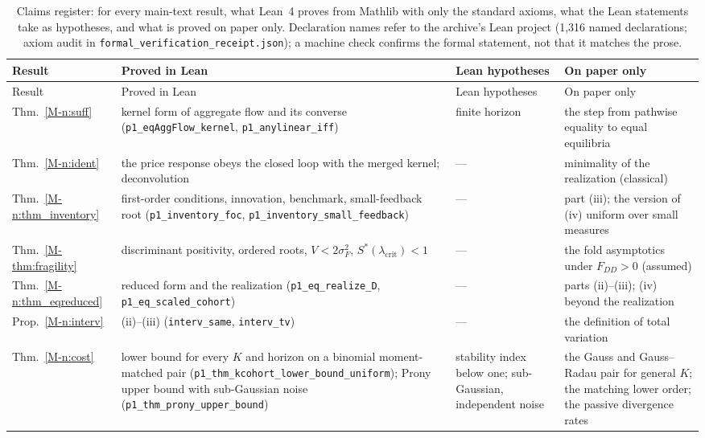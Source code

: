 \documentclass[12pt]{article}
\theoremstyle{definition}
\theoremstyle{remark}
\begin{document}
{\footnotesize
\begin{longtable}{>{\raggedright\arraybackslash}p{}>{\raggedright\arraybackslash}p{}>{\raggedright\arraybackslash}p{}>{\raggedright\arraybackslash}p{}}
\caption{Claims register: for every main-text result, what Lean~4 proves from Mathlib with only the standard axioms, what the Lean statements take as hypotheses, and what is proved on paper only. Declaration names refer to the archive's Lean project (1,316 named declarations; axiom audit in \nolinkurl{formal_verification_receipt.json}); a machine check confirms the formal statement, not that it matches the prose.}\label{tab:claims}\\
\toprule
Result & Proved in Lean & Lean hypotheses & On paper only\\
\midrule
\endfirsthead
\toprule
Result & Proved in Lean & Lean hypotheses & On paper only\\
\midrule
\endhead
Thm.~\ref{M-n:suff} & kernel form of aggregate flow and its converse (\texttt{p1\_\allowbreak{}eqAggFlow\_\allowbreak{}kernel}, \texttt{p1\_\allowbreak{}anylinear\_\allowbreak{}iff}) & finite horizon & the step from pathwise equality to equal equilibria\\
Thm.~\ref{M-n:ident} & the price response obeys the closed loop with the merged kernel; deconvolution & --- & minimality of the realization (classical)\\
Thm.~\ref{M-n:thm_inventory} & first-order conditions, innovation, benchmark, small-feedback root (\texttt{p1\_\allowbreak{}inventory\_\allowbreak{}foc}, \texttt{p1\_\allowbreak{}inventory\_\allowbreak{}small\_\allowbreak{}feedback}) & --- & part (iii); the version of (iv) uniform over small measures\\
Thm.~\ref{M-thm:fragility} & discriminant positivity, ordered roots, $V < 2\sigma_F^2$, $S^*(\lambda_{\mathrm{crit}}) < 1$ & --- & the fold asymptotics under $F_{DD} > 0$ (assumed)\\
Thm.~\ref{M-n:thm_eqreduced} & reduced form and the realization (\texttt{p1\_\allowbreak{}eq\_\allowbreak{}realize\_\allowbreak{}D}, \texttt{p1\_\allowbreak{}eq\_\allowbreak{}scaled\_\allowbreak{}cohort}) & --- & parts (ii)--(iii); (iv) beyond the realization\\
Prop.~\ref{M-n:interv} & (ii)--(iii) (\texttt{interv\_\allowbreak{}same}, \texttt{interv\_\allowbreak{}tv}) & --- & the definition of total variation\\
Thm.~\ref{M-n:cost} & lower bound for every $K$ and horizon on a binomial moment-matched pair (\texttt{p1\_\allowbreak{}thm\_\allowbreak{}kcohort\_\allowbreak{}lower\_\allowbreak{}bound\_\allowbreak{}uniform}); Prony upper bound with sub-Gaussian noise (\texttt{p1\_\allowbreak{}thm\_\allowbreak{}prony\_\allowbreak{}upper\_\allowbreak{}bound}) & stability index below one; sub-Gaussian, independent noise & the Gauss and Gauss--Radau pair for general $K$; the matching lower order; the passive divergence rates\\

\end{longtable}}
\end{document}

